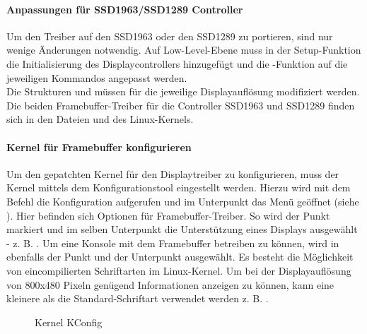 \paragraph{Anpassungen für SSD1963/SSD1289 Controller}
Um den Treiber auf den SSD1963 oder den SSD1289 zu portieren, sind nur wenige Änderungen notwendig. Auf Low-Level-Ebene muss in der Setup-Funktion die Initialisierung des Displaycontrollers hinzugefügt und die -Funktion auf die jeweiligen Kommandos angepasst werden. \\
Die Strukturen  und  müssen für die jeweilige Displayauflösung modifiziert werden. Die beiden Framebuffer-Treiber für die Controller SSD1963 und SSD1289 finden sich in den Dateien  und  des Linux-Kernels.
\newpage
\paragraph{Kernel für Framebuffer konfigurieren}
Um den gepatchten Kernel für den Displaytreiber zu konfigurieren, muss der Kernel mittels dem Konfigurationstool  eingestellt werden. 
Hierzu wird mit dem Befehl  die Konfiguration aufgerufen und im Unterpunkt  das Menü  geöffnet (siehe ). Hier befinden sich Optionen für Framebuffer-Treiber. So wird der Punkt  markiert und im selben Unterpunkt die Unterstützung eines Displays ausgewählt - z. B. . 
Um eine Konsole mit dem Framebuffer betreiben zu können, wird in  
ebenfalls der Punkt  und der Unterpunkt  ausgewählt. Es besteht die Möglichkeit von eincompilierten Schriftarten im Linux-Kernel. Um bei der Displayauflösung von 800x480 Pixeln genügend Informationen anzeigen zu können, kann eine kleinere als die Standard-Schriftart verwendet werden z. B. .
\begin{figure}[tbph]
	\centering
{}
	\caption{Kernel KConfig}
	\label{fig:kernel_config}
\end{figure}
\newpage
